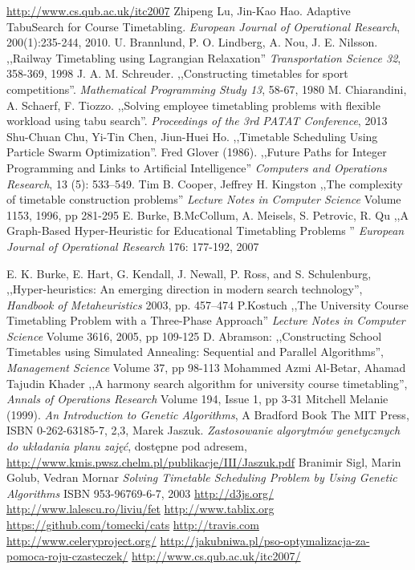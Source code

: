 \documentclass[11pt]{report}
\begin{document}
\begin{thebibliography}{2}
 \url{http://www.cs.qub.ac.uk/itc2007}
 Zhipeng Lu, Jin-Kao Hao. Adaptive TabuSearch for Course Timetabling.  \emph{European Journal of Operational Research}, 200(1):235-244, 2010.
 U. Brannlund, P. O. Lindberg, A. Nou, J. E. Nilsson. ,,Railway Timetabling using Lagrangian Relaxation'' \emph{Transportation Science 32}, 358-369, 1998
 J. A. M. Schreuder. ,,Constructing timetables for sport competitions''. \emph{Mathematical Programming Study 13}, 58-67, 1980
 M. Chiarandini, A. Schaerf, F. Tiozzo. ,,Solving employee timetabling problems with flexible workload using tabu search''. \emph{Proceedings of the 3rd PATAT Conference}, 2013
 Shu-Chuan Chu, Yi-Tin Chen, Jiun-Huei Ho. ,,Timetable Scheduling Using Particle Swarm Optimization''. 
 Fred Glover (1986). ,,Future Paths for Integer Programming and Links to Artificial Intelligence'' \emph{Computers and Operations Research}, 13 (5): 533–549.
 Tim B. Cooper, Jeffrey H. Kingston ,,The complexity of timetable construction problems''  \emph{Lecture Notes in Computer Science} Volume 1153, 1996, pp 281-295 
  E. Burke, B.McCollum, A. Meisels, S. Petrovic, R. Qu ,,A Graph-Based Hyper-Heuristic for Educational Timetabling Problems '' \emph{European Journal of Operational Research} 176: 177-192, 2007

 E. K. Burke, E. Hart, G. Kendall, J. Newall, P. Ross, and S. Schulenburg, ,,Hyper-heuristics: An emerging direction in modern search technology'', \emph{Handbook of Metaheuristics } 2003, pp. 457–474
 P.Kostuch ,,The University Course Timetabling Problem with a Three-Phase Approach'' \emph{
Lecture Notes in Computer Science} Volume 3616, 2005, pp 109-125
 D. Abramson: ,,Constructing School Timetables using Simulated Annealing: Sequential and Parallel Algorithms'', \emph{Management Science} Volume 37, pp 98-113
  Mohammed Azmi Al-Betar, Ahamad Tajudin Khader ,,A harmony search algorithm for university course timetabling'',  
\emph{Annals of Operations Research} Volume 194, Issue 1, pp 3-31 
 Mitchell Melanie (1999). \emph{An Introduction to Genetic Algorithms}, A Bradford Book The MIT Press, ISBN 0-262-63185-7, 2,3,
 Marek Jaszuk. \emph{Zastosowanie algorytmów genetycznych do układania planu zajęć}, dostępne pod adresem, \url{http://www.kmis.pwsz.chelm.pl/publikacje/III/Jaszuk.pdf}
 Branimir Sigl, Marin Golub, Vedran Mornar \emph{Solving Timetable Scheduling Problem by Using Genetic Algorithms} ISBN 953-96769-6-7, 2003
 \url{http://d3js.org/}
 \url{http://www.lalescu.ro/liviu/fet}
 \url{http://www.tablix.org}
 \url{https://github.com/tomecki/cats}
 \url{http://travis.com}
 \url{http://www.celeryproject.org/}
 \url{http://jakubniwa.pl/pso-optymalizacja-za-pomoca-roju-czasteczek/}
 \url{http://www.cs.qub.ac.uk/itc2007/}
\end{thebibliography}
\end{document}
